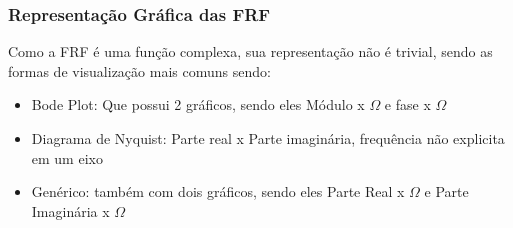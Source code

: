 \documentclass{article}
\begin{document}
\subsubsection*{Representação Gráfica das FRF}
Como a FRF é uma função complexa, sua representação não é trivial, sendo as formas de visualização mais comuns sendo:
\begin{itemize}
    \item Bode Plot: Que possui 2 gráficos, sendo eles Módulo x $\Omega$ e fase x $\Omega$
    \item Diagrama de Nyquist: Parte real x Parte imaginária, frequência não explicita em um eixo
    \item Genérico: também com dois gráficos, sendo eles Parte Real x $\Omega$ e Parte Imaginária x $\Omega$
\end{itemize}
\end{document}
